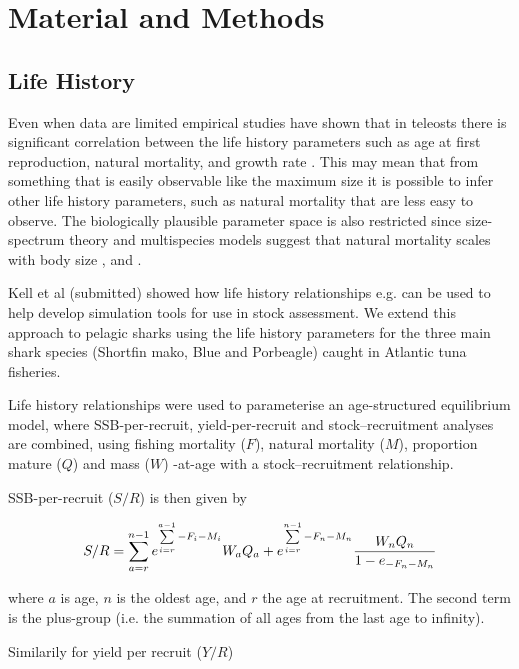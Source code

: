 \documentclass[preprint,authoryear,12pt]{elsarticle}
\begin{document}
\section{Material and Methods}
\label{Methods}

\subsection{Life History}
Even when data are limited empirical studies have shown that in teleosts there is significant correlation between the life history parameters  
such as age at first  reproduction, natural mortality, and growth rate \citet{roff1984evolution}. This may mean that from something that  
is easily observable like the maximum size it is possible to infer other life history parameters, such as natural mortality that are less easy to observe.  
The biologically plausible parameter space is also restricted since size-spectrum theory and multispecies models  
suggest that natural mortality scales with body size \citet{andersen2006asymptotic}, \citet{pope2006modelling} and \citet{gislason2008coexistence}.  

Kell et al (submitted) showed how life history relationships e.g. \citet{gislason2010does} can be used to help develop simulation tools for use
in stock assessment. We extend this approach to pelagic sharks using the life history parameters for the three main shark species 
(Shortfin mako, Blue and Porbeagle) caught in Atlantic tuna fisheries.
 
Life history relationships were used to parameterise an age-structured equilibrium model, where SSB-per-recruit, yield-per-recruit  
and stock–recruitment analyses are combined, using fishing mortality ($F$), natural mortality ($M$), proportion  
mature ($Q$) and mass ($W$) -at-age with a stock–recruitment relationship. 
 
SSB-per-recruit ($S/R$) is then given by 
 
\begin{equation} 
S/R=\sum\limits_{a=r}^{n-1} {e^{\sum\limits_{i=r}^{a-1} {-F_i-M_i}}} W_a Q_a + e^{\sum\limits_{i=r}^{n-1} {-F_n-M_n}} \frac{W_n Q_n}{1-e_{-F_n-M_n}}\\ 
\end{equation}  
 
where $a$ is age, $n$ is the oldest age, and $r$ the age at recruitment. The second term is the plus-group (i.e. the summation of all ages from the  
last age to infinity).  
 
Similarily for yield per recruit ($Y/R$) 
 
\end{document}
